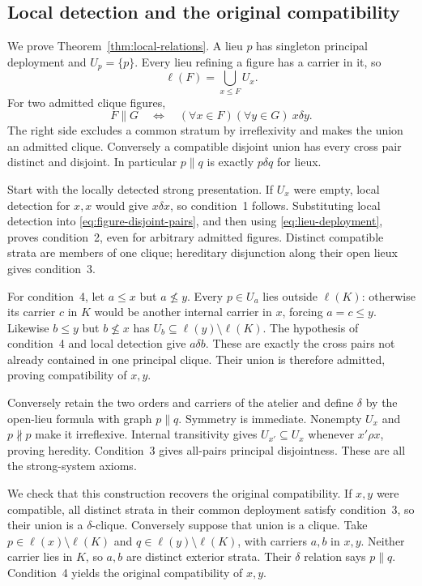 \subsection{Local detection and the original compatibility}
We prove Theorem~\ref{thm:local-relations}. A lieu $p$ has
singleton principal deployment and $U_p=\{p\}$. Every lieu
refining a figure has a carrier in it, so
\begin{equation}\label{eq:lieu-deployment}
 \ell(F)=\bigcup_{x\leq F}U_x.
\end{equation}
For two admitted clique figures,
\begin{equation}\label{eq:figure-disjoint-pairs}
 F\parallel G\quad\Longleftrightarrow\quad
 (\forall x\in F)(\forall y\in G)\ x\delta y.
\end{equation}
The right side excludes a common stratum by irreflexivity and
makes the union an admitted clique. Conversely a compatible
disjoint union has every cross pair distinct and disjoint.
In particular $p\parallel q$ is exactly $p\delta q$ for lieux.

Start with the locally detected strong presentation. If $U_x$
were empty, local detection for $x,x$ would give $x\delta x$,
so condition~1 follows. Substituting local detection into
\eqref{eq:figure-disjoint-pairs}, and then using
\eqref{eq:lieu-deployment}, proves condition~2, even for
arbitrary admitted figures. Distinct compatible strata are
members of one clique; hereditary disjunction along their open
lieux gives condition~3.

For condition~4, let $a\leq x$ but $a\not\leq y$.
Every $p\in U_a$ lies outside $\ell(K)$: otherwise its carrier
$c$ in $K$ would be another internal carrier in $x$, forcing
$a=c\leq y$. Likewise $b\leq y$ but $b\not\leq x$ has
$U_b\subseteq\ell(y)\setminus\ell(K)$.
The hypothesis of condition~4 and local detection give
$a\delta b$. These are exactly the cross pairs not already
contained in one principal clique. Their union is therefore
admitted, proving compatibility of $x,y$.

Conversely retain the two orders and carriers of the atelier
and define $\delta$ by the open-lieu formula with graph
$p\parallel q$. Symmetry is immediate. Nonempty $U_x$ and
$p\not\parallel p$ make it irreflexive. Internal transitivity
gives $U_{x'}\subseteq U_x$ whenever $x'\rho x$, proving
heredity. Condition~3 gives all-pairs principal disjointness.
These are all the strong-system axioms.

We check that this construction recovers the original
compatibility. If $x,y$ were compatible, all distinct strata
in their common deployment satisfy condition~3, so their
union is a $\delta$-clique. Conversely suppose that union
is a clique. Take $p\in\ell(x)\setminus\ell(K)$ and
$q\in\ell(y)\setminus\ell(K)$, with carriers $a,b$ in
$x,y$. Neither carrier lies in $K$, so $a,b$ are distinct
exterior strata. Their $\delta$ relation says $p\parallel q$.
Condition~4 yields the original compatibility of $x,y$.

